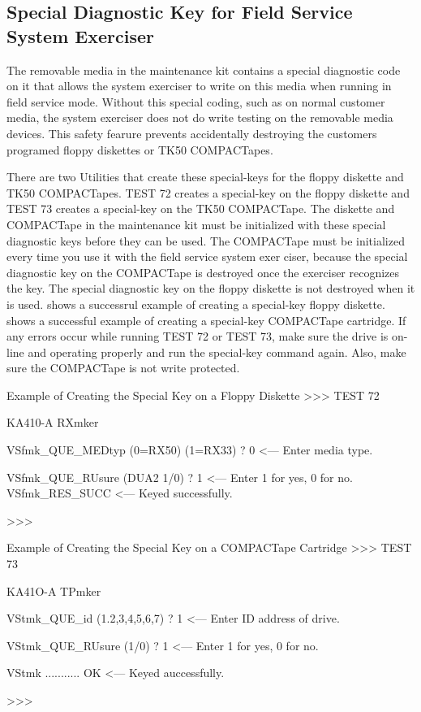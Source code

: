 \subsection{Special Diagnostic Key for Field Service System Exerciser}

The removable media in the maintenance kit contains a special diagnostic
code on it that allows the system exerciser to write on this media when 
running in field service mode. Without this special coding, such as on normal
customer media, the system exerciser does not do write testing on the 
removable media devices. This safety fearure prevents accidentally destroying
the customers programed floppy diskettes or TK50 COMPACTapes.

There are two Utilities that create these special-keys for the floppy diskette
and TK50 COMPACTapes. TEST 72 creates a special-key on the floppy
diskette and TEST 73 creates a special-key on the TK50 COMPACTape. The
diskette and COMPACTape in the maintenance kit must be initialized with
these special diagnostic keys before they can be used. The COMPACTape
must be initialized every time you use it with the field service system exer
ciser, because the special diagnostic key on the COMPACTape is destroyed
once the exerciser recognizes the key. The special diagnostic key on the
floppy diskette is not destroyed when it is used.  shows a 
successrul example of creating a special-key floppy diskette.  shows
a successful example of creating a special-key COMPACTape cartridge. If
any errors occur while running TEST 72 or TEST 73, make sure the drive
is on-line and operating properly and run the special-key command again.
Also, make sure the COMPACTape is not write protected.

\begin{ttfig}{Example of Creating the Special Key on a Floppy Diskette}
>>> TEST 72

                      KA410-A RXmker

VSfmk_QUE_MEDtyp (0=RX50) (1=RX33) ? 0  <--- Enter media type.

VSfmk_QUE_RUsure (DUA2 1/0) ? 1         <--- Enter 1 for yes,
                                             0 for no.
VSfmk_RES_SUCC                          <--- Keyed successfully.

>>>
\end{ttfig}

\begin{ttfig}{Example of Creating the Special Key on a COMPACTape Cartridge}
>>> TEST 73

                      KA41O-A TPmker

VStmk_QUE_id (1.2,3,4,5,6,7) ? 1   <--- Enter ID address of drive.

VStmk_QUE_RUsure (1/0) ? 1         <--- Enter 1 for yes, 0 for no.

VStmk ........... OK               <--- Keyed auccessfully.

>>>
\end{ttfig}

